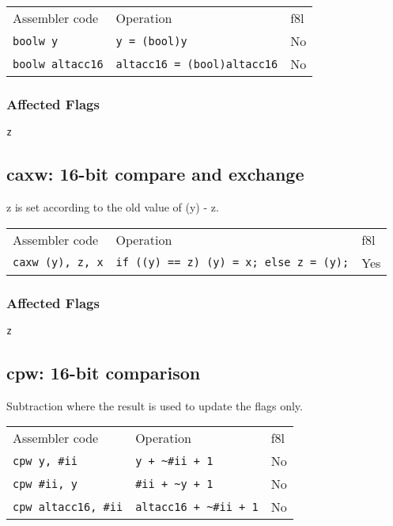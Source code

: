 \documentclass{book}
\begin{document}
\begin{tabular}{l l l}
Assembler code          & Operation                          & f8l \\
\texttt{boolw y}        & \texttt{y = (bool)y}               & No \\
\texttt{boolw altacc16} & \texttt{altacc16 = (bool)altacc16} & No \\
\end{tabular}

\subsubsection*{Affected Flags}

\texttt{z}


\subsection{caxw: 16-bit compare and exchange}

z is set according to the old value of (y) - z.

\begin{tabular}{l l l}
Assembler code           & Operation                                     & f8l \\
\texttt{caxw (y), z, x}  & \texttt{if ((y) == z) (y) = x; else z = (y);} & Yes \\

\end{tabular}

\subsubsection*{Affected Flags}

\texttt{z}


\subsection{cpw: 16-bit comparison}

Subtraction where the result is used to update the flags only.

\begin{tabular}{l l l}
Assembler code              & Operation                        & f8l\\
\texttt{cpw y, \#ii}        & \texttt{y + \~{}\#ii + 1}        & No \\
\texttt{cpw \#ii, y}        & \texttt{\#ii + \~{}y + 1}        & No \\
\texttt{cpw altacc16, \#ii} & \texttt{altacc16 + \~{}\#ii + 1} & No \\
\end{tabular}
\end{document}
